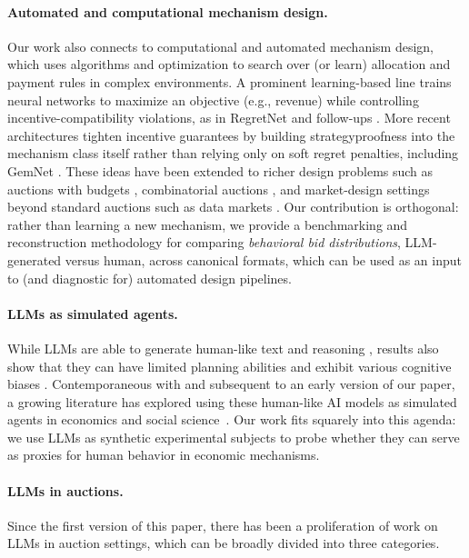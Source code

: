 \paragraph{Automated and computational mechanism design.}
Our work also connects to computational and automated mechanism design, which uses algorithms and optimization to search over (or learn) allocation and payment rules in complex environments.
A prominent learning-based line trains neural networks to maximize an objective (e.g., revenue) while controlling incentive-compatibility violations, as in RegretNet and follow-ups \citep{dutting2024optimal,curry102automated}. More recent architectures tighten incentive guarantees by building strategyproofness into the mechanism class itself rather than relying only on soft regret penalties, including GemNet \citep{wang2024gemnet}. These ideas have been extended to richer design problems such as auctions with budgets \citep{feng2018deep}, combinatorial auctions \citep{wang2025bundleflow}, and market-design settings beyond standard auctions such as data markets \citep{ravindranath2023data}.
Our contribution is orthogonal: rather than learning a new mechanism, we provide a benchmarking and reconstruction methodology for comparing \emph{behavioral bid distributions}, LLM-generated versus human, across canonical formats, which can be used as an input to (and diagnostic for) automated design pipelines.

\paragraph{LLMs as simulated agents.} While LLMs  are able to generate human-like text and reasoning \citep{achiam2023gpt, bubeck2023sparks}, results also show that they can  have limited planning abilities and
exhibit various cognitive biases \citep{wan2023kelly}. Contemporaneous with and subsequent to an early version of our paper, a growing literature has explored using these human-like AI models as simulated agents in economics and social science~\citep{aher2023using, park2023generative, horton2023large, manning2024automated}. Our work fits squarely into this agenda: we use LLMs as synthetic experimental subjects to probe whether they can serve as proxies for human behavior in economic mechanisms.

\paragraph{LLMs in auctions.} Since the first version of this paper, there has been a proliferation of work on LLMs in auction settings, which can be broadly divided into three categories.

